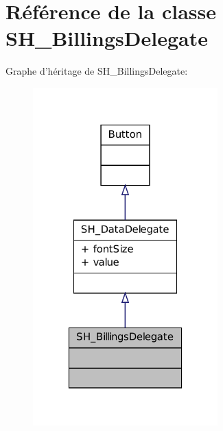 \hypertarget{classSH__BillingsDelegate}{\section{Référence de la classe S\-H\-\_\-\-Billings\-Delegate}
\label{classSH__BillingsDelegate}
}


Graphe d'héritage de S\-H\-\_\-\-Billings\-Delegate\-:\nopagebreak
\begin{figure}[H]
\begin{center}
\leavevmode
\includegraphics[width=202pt]{classSH__BillingsDelegate__inherit__graph}
\end{center}
\end{figure}


